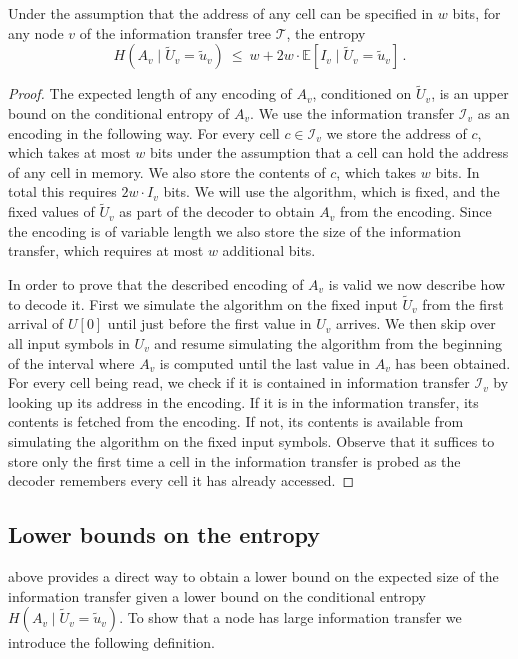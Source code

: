 \documentclass{toc}
\newcommand{\calT}{\ensuremath{\mathcal{T}}}
\newcommand{\expected}[1]{\ensuremath{\mathbb{E}[#1]}}
\newcommand{\lit}{large information transfer\xspace}
\newcommand{\Xv}{\ensuremath{U_v}}
\newcommand{\Xvknown}{\ensuremath{\widetilde{U}_v}}
\newcommand{\Xvfix}{\ensuremath{\widetilde{u}_v}}
\newcommand{\Yv}{\ensuremath{A_v}}
\newcommand{\vitset}{\ensuremath{\mathcal{I}_v}}
\newcommand{\vit}{\ensuremath{I_v}}
\newcommand{\Patrascu}{P{\v a}tra{\c s}cu\xspace}
\begin{document}
\begin{lemma}[\Patrascu and Demaine~\cite{PD2006:Low-Bounds}]\label{lem:H-upper-old}
	Under the assumption that the address of any cell can be specified in $w$ bits, for any node $v$ of the information transfer tree $\calT$, the entropy 
	$$
	H(\Yv\mid\Xvknown=\Xvfix)~\leq~w + 2w\cdot \expected{\vit \mid \Xvknown=\Xvfix}\,.
	$$
\end{lemma}
\begin{proof}
	The expected length of any encoding of $\Yv$, conditioned on $\Xvknown$, is an upper bound on the conditional entropy of $\Yv$.
	We use the information transfer $\vitset$ as an encoding in the following way. For every cell $c\in\vitset$ we store the address of $c$, which takes at most $w$ bits under the assumption that a cell can hold the address of any cell in memory.
	We also store the contents of $c$, which takes $w$ bits.
	In total this requires $2w\cdot \vit$ bits.
	We will use the algorithm, which is fixed, and the fixed values of $\Xvknown$ as part of the decoder to obtain $\Yv$ from the encoding. Since the encoding is of variable length we also store the size of the information transfer, which requires at most $w$ additional bits.
	
	In order to prove that the described encoding of $\Yv$ is valid we now describe how to decode it.
	First we simulate the algorithm on the fixed input $\Xvknown$ from the first arrival of $U[0]$ until just before the first value in $\Xv$ arrives.
	We then skip over all input symbols in $\Xv$
	and resume simulating the algorithm from the beginning of the interval
	where $\Yv$ is %
	computed until the last value in $\Yv$ has been obtained.
	For every cell being read, we check if it is contained in information transfer $\vitset$ by looking up its address in the encoding.
	If it is in the information transfer, its contents is fetched from the encoding. If not, its contents is available from simulating the algorithm on the fixed input symbols.
	Observe that it suffices to
	store only the first time a cell in the information transfer is probed as the decoder
	remembers every cell it has already accessed.
\end{proof}


\subsection{Lower bounds on the entropy}\label{sec:entropylower}

 above provides a direct way to obtain a lower bound on the expected size of the information transfer given a lower bound on the conditional entropy $H(\Yv\mid\Xvknown=\Xvfix)$.
To show that a node has \lit we introduce the following definition.
\end{document}
